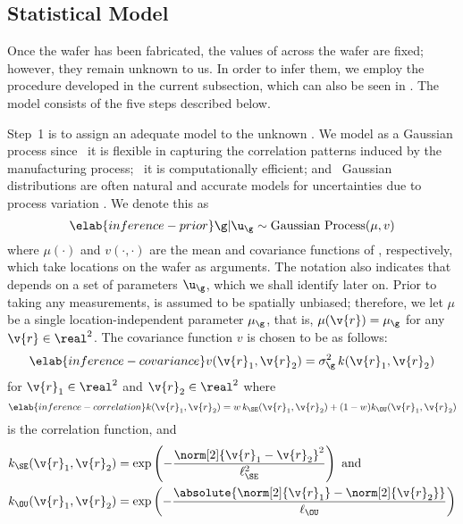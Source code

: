 \subsection{Statistical Model}

Once the wafer has been fabricated, the values of \g across the wafer are fixed;
however, they remain unknown to us. In order to infer them, we employ the
procedure developed in the current subsection, which can also be seen in
. The model consists of the five steps
described below.

Step~1 is to assign an adequate model to the unknown \g. We model \g as a
Gaussian process \cite{rasmussen2006} since \one~it is flexible in capturing the
correlation patterns induced by the manufacturing process; \two~it is
computationally efficient; and \three~Gaussian distributions are often natural
and accurate models for uncertainties due to process variation
\cite{srivastava2010, reda2009, juan2012}. We denote this as
\begin{equation} \elab{inference-prior}
  \g | \u_\g \sim \mathrm{Gaussian\ Process}(\mu, v)
\end{equation}
where $\mu(\cdot)$ and $v(\cdot, \cdot)$ are the mean and covariance functions
of \g, respectively, which take locations on the wafer as arguments. The
notation also indicates that \g depends on a set of parameters $\u_\g$, which we
shall identify later on. Prior to taking any measurements, \g is assumed to be
spatially unbiased; therefore, we let $\mu$ be a single location-independent
parameter $\mu_\g$, that is, $\mu(\v{r}) = \mu_\g$ for any $\v{r} \in \real^2$.
The covariance function $v$ is chosen to be as follows:
\begin{equation} \elab{inference-covariance}
  v(\v{r}_1, \v{r}_2) = \sigma_\g^2 \, k(\v{r}_1, \v{r}_2)
\end{equation}
for $\v{r}_1 \in \real^2$ and $\v{r}_2 \in \real^2$ where
\begin{equation} \elab{inference-correlation}
  k(\v{r}_1, \v{r}_2) = w \, k_\SE(\v{r}_1, \v{r}_2) + (1 - w) k_\OU(\v{r}_1, \v{r}_2)
\end{equation}
is the correlation function, and
\begin{align*}
  k_\SE(\v{r}_1, \v{r}_2) & = \exp\left(-\frac{\norm[2]{\v{r}_1 - \v{r}_2}^2}{\ell_\SE^2}\right) \text{ and} \\
  k_\OU(\v{r}_1, \v{r}_2) & = \exp\left(-\frac{\absolute{\norm[2]{\v{r}_1} - \norm[2]{\v{r}_2}}}{\ell_\OU}\right)
\end{align*}

